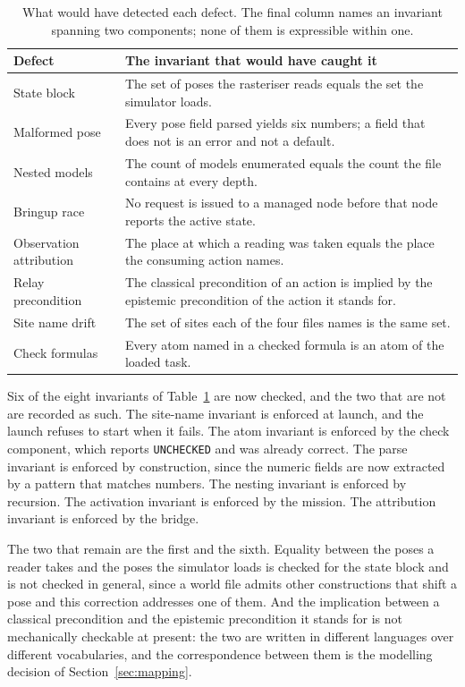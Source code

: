 \documentclass[11pt,a4paper]{article}
\theoremstyle{definition}
\newcommand{\code}[1]{\texttt{\small #1}}
\begin{document}
\begin{table}[H]
\centering\small
\caption{What would have detected each defect. The final column names an
invariant spanning two components; none of them is expressible within one.}
\label{tab:detect}
\begin{tabularx}{\textwidth}{@{}p{}X@{}}
\toprule
\textbf{Defect} & \textbf{The invariant that would have caught it} \\
\midrule
State block &
The set of poses the rasteriser reads equals the set the simulator loads. \\
\addlinespace
Malformed pose &
Every pose field parsed yields six numbers; a field that does not is an error
and not a default. \\
\addlinespace
Nested models &
The count of models enumerated equals the count the file contains at every
depth. \\
\addlinespace
Bringup race &
No request is issued to a managed node before that node reports the active
state. \\
\addlinespace
Observation attribution &
The place at which a reading was taken equals the place the consuming action
names. \\
\addlinespace
Relay precondition &
The classical precondition of an action is implied by the epistemic
precondition of the action it stands for. \\
\addlinespace
Site name drift &
The set of sites each of the four files names is the same set. \\
\addlinespace
Check formulas &
Every atom named in a checked formula is an atom of the loaded task. \\
\bottomrule
\end{tabularx}
\end{table}

Six of the eight invariants of Table~\ref{tab:detect} are now checked, and the
two that are not are recorded as such. The site-name invariant is enforced at
launch, and the launch refuses to start when it fails. The atom invariant is
enforced by the check component, which reports \code{UNCHECKED} and was already
correct. The parse invariant is enforced by construction, since the numeric
fields are now extracted by a pattern that matches numbers. The nesting
invariant is enforced by recursion. The activation invariant is enforced by
the mission. The attribution invariant is enforced by the bridge.

The two that remain are the first and the sixth. Equality between the poses a
reader takes and the poses the simulator loads is checked for the state block
and is not checked in general, since a world file admits other constructions
that shift a pose and this correction addresses one of them. And the
implication between a classical precondition and the epistemic precondition it
stands for is not mechanically checkable at present: the two are written in
different languages over different vocabularies, and the correspondence between
them is the modelling decision of Section~\ref{sec:mapping}.
\end{document}

